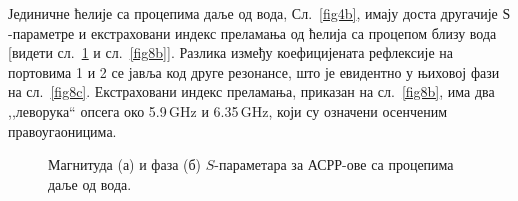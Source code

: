 Јединичне ћелије са процепима даље од вода, Сл.~\ref{fig4b}, имају доста другачије $Ѕ$-параметре и екстраховани индекс преламања од ћелија са процепом близу вода [видети сл.~\ref{fig8} и сл.~\ref{fig8b}]. Разлика између коефицијената рефлексије на портовима 1 и 2 се јавља код друге резонансе, што је евидентно у њиховој фази на сл.~\ref{fig8c}. Екстраховани индекс преламања, приказан на сл.~\ref{fig8b}, има два ,,леворука`` опсега око 5.9\,GHz и 6.35\,GHz, који су означени осенченим правоугаоницима.
\begin{figure}[!t]
\caption{Магнитуда (а) и фаза (б) $S$-параметара за АСРР-ове са процепима даље од вода.}
\label{fig8}
\end{figure}
